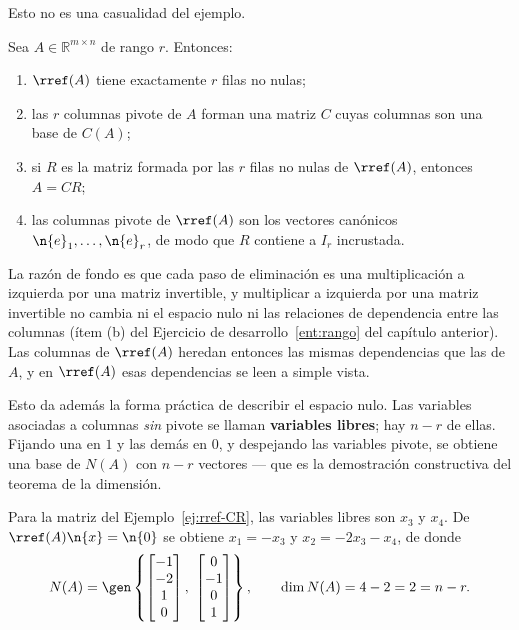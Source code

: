 Esto no es una casualidad del ejemplo.

\begin{proposition}\label{prop:rref-CR}
Sea $A\in\mathbb{R}^{m\times n}$ de rango $r$. Entonces:
\begin{enumerate}[label=(\roman*),itemsep=1pt]
\item $\rref(A)$ tiene exactamente $r$ filas no nulas;
\item las $r$ columnas pivote de $A$ forman una matriz $C$ cuyas columnas son
una base de $C(A)$;
\item si $R$ es la matriz formada por las $r$ filas no nulas de $\rref(A)$,
entonces $A = CR$;
\item las columnas pivote de $\rref(A)$ son los vectores canónicos
$\n{e}_1,\dots,\n{e}_r$, de modo que $R$ contiene a $I_r$ incrustada.
\end{enumerate}
\end{proposition}

La razón de fondo es que cada paso de eliminación es una multiplicación a
izquierda por una matriz invertible, y multiplicar a izquierda por una matriz
invertible no cambia ni el espacio nulo ni las relaciones de dependencia entre
las columnas (ítem (b) del Ejercicio de desarrollo~\ref{ent:rango} del capítulo
anterior). Las columnas de $\rref(A)$ heredan entonces las mismas
dependencias que las de $A$, y en $\rref(A)$ esas dependencias se leen a simple
vista.

Esto da además la forma práctica de describir el espacio nulo. Las variables
asociadas a columnas \emph{sin} pivote se llaman \textbf{variables libres}; hay
$n-r$ de ellas. Fijando una en $1$ y las demás en $0$, y despejando las
variables pivote, se obtiene una base de $N(A)$ con $n-r$ vectores --- que es la
demostración constructiva del teorema de la dimensión.

\begin{example}
Para la matriz del Ejemplo~\ref{ej:rref-CR}, las variables libres son $x_3$ y
$x_4$. De $\rref(A)\n{x}=\n{0}$ se obtiene $x_1 = -x_3$ y $x_2 = -2x_3-x_4$,
de donde
\[
N(A) = \gen\left\{
\begin{bmatrix} -1\\ -2\\ 1\\ 0\end{bmatrix},\
\begin{bmatrix} 0\\ -1\\ 0\\ 1\end{bmatrix}
\right\},
\qquad \dim N(A) = 4-2 = 2 = n-r .
\]
\end{example}


